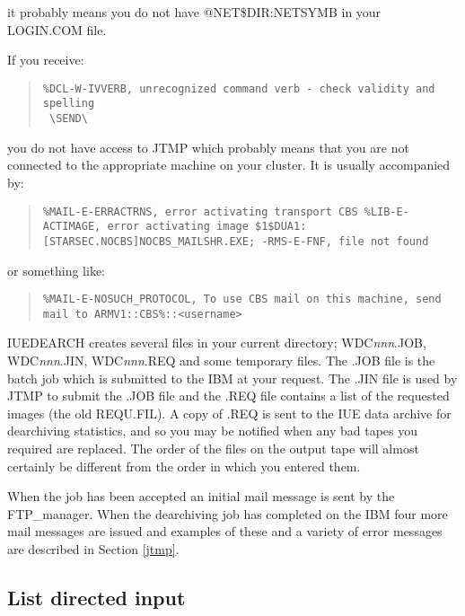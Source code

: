 it probably means you do not 
have @NET\$DIR:NETSYMB in your LOGIN.COM file.

If you receive:

\begin{quote}
\begin{verbatim}
%DCL-W-IVVERB, unrecognized command verb - check validity and spelling
 \SEND\
\end{verbatim}
\end{quote}

you do not have access to JTMP which probably means that you are not connected 
to the appropriate machine on your cluster. It is usually accompanied by:

\small
\begin{quote}
{\tt \%MAIL-E-ERRACTRNS, error activating transport CBS
\newline
\%LIB-E-ACTIMAGE, error activating image \$1\$DUA1:[STARSEC.NOCBS]NOCBS\_MAILSHR.EXE;
\newline
-RMS-E-FNF, file not found}
\end{quote}
\normalsize

or something like:

\begin{quote}
{\tt \%MAIL-E-NOSUCH\_PROTOCOL, To use CBS mail on this machine, send mail to
\newline
ARMV1::CBS\%<NRS node name>::<username>}
\end{quote}

IUEDEARCH creates several files in your current directory;
WDC{\it nnn}.JOB, WDC{\it nnn}.JIN, WDC{\it nnn}.REQ and some temporary files.
The .JOB file is the batch job which is submitted to the IBM at your request.
The .JIN file is used by JTMP to submit the .JOB file and the .REQ file contains
a list of the requested images (the old REQU.FIL).
A copy of .REQ is sent to the IUE data archive for dearchiving 
statistics, and so you may be notified
when any bad tapes you required are replaced.
The order of the files on the output tape will almost certainly
be different from the order in which you
entered them.

When the job has been accepted an initial mail message is sent by the 
FTP\_manager.
When the dearchiving job has completed on the IBM four more mail messages
are issued and examples of these and a variety of error messages 
are described in Section \ref{jtmp}.

\subsection {List directed input}
\label{list}

